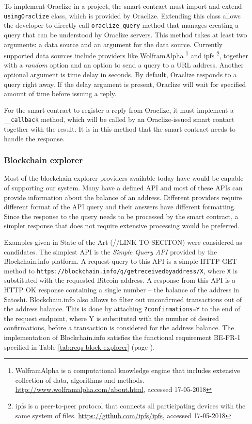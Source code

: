 To implement Oraclize in a project, the smart contract must import and extend \texttt{usingOraclize} class, which is provided by Oraclize. Extending this class allows the developer to directly call \texttt{oraclize\_query} method that manages creating a query that can be understood by Oraclize servers. This method takes at least two arguments: a data source and an argument for the data source. Currently supported data sources include providers like WolframAlpha%
\footnote{WolframAlpha is a computational knowledge engine that includes extensive collection of data, algorithms and methods. \url{http://www.wolframalpha.com/about.html}, accessed 17-05-2018}%
and \acrshort{ipfs}%
\footnote{\acrfull{ipfs} is a peer-to-peer protocol that connects all participating devices with the same system of files. \url{https://github.com/ipfs/ipfs}, accessed 17-05-2018},%
together with a \textit{random} option and an option to send a query to a URL address. Another optional argument is time delay in seconds. By default, Oraclize responds to a query right away. If the delay argument is present, Oraclize will wait for specified amount of time before issuing a reply.

For the smart contract to register a reply from Oraclize, it must implement a \texttt{\_\_callback} method, which will be called by an Oraclize-issued smart contact together with the result. It is in this method that the smart contract needs to handle the response.
% 
\subsubsection{Blockchain explorer}
Most of the blockchain explorer providers available today have would be capable of supporting our system. Many have a defined API and most of these APIs can provide information about the balance of an address. Different providers require different format of the API query and their answers have different formatting. Since the response to the query needs to be processed by the smart contract, a simpler response that does not require extensive processing would be preferred.

\begin{sloppypar}
Examples given in State of the Art (//LINK TO SECITON) were considered as candidates. The simplest API is the \textit{Simple Query API} provided by the Blockchain.info platform. A request query to this API is a simple HTTP GET method to \texttt{https://blockchain.info/q/getreceivedbyaddress/X}, where \texttt{X} is substituted with the requested Bitcoin address. A response from this API is a HTTP OK response containing a single number -- the balance of the address in Satoshi. Blockchain.info also allows to filter out unconfirmed transactions out of the address balance. This is done by attaching \texttt{?confirmations=Y} to the end of the request endpoint, where Y is substituted with the number of desired confirmations, before a transaction is considered for the address balance. The implementation of Blockchain.info satisfies the functional requirement BE-FR-1 specified in Table \ref{tab:reqs-block-explorer} (page \pageref{tab:reqs-block-explorer}).
\end{sloppypar}

